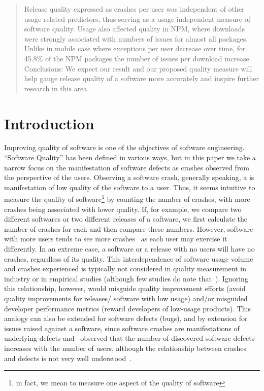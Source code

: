 \documentclass[smallextended]{svjour3}       %
\begin{document}
\begin{abstract}
  Release quality expressed as crashes per user was independent of
  other usage-related predictors, thus serving as a usage independent
  measure of software quality. Usage also affected quality in NPM, where
  downloads were strongly associated with numbers of issues for
  almost all packages. Unlike in mobile case where exceptions per
  user decrease over time, %
  for 45.8\% of the NPM packages the number of issues per download
  increase.
Conclusions: We expect our result and our proposed quality measure will help
  gauge release quality of a software more accurately and inspire further 
  research in this area.

\end{abstract}

\section{Introduction}\label{s:intro}

Improving quality of software is one of the objectives of software
engineering.  ``Software Quality'' has been defined in various ways,
but in this paper we take a narrow focus on the manifestation of software
defects as crashes observed from the perspective of the
users. Observing a software crash, generally speaking, a is
manifestation of low quality of the software to a user. 
Thus, it seems intuitive to measure the quality of software\footnote{in fact, we
  mean to measure one aspect of the quality of software}
by counting the number of crashes, with more crashes being associated
with lower quality. If, for example, we compare 
two different softwares or two different releases of a software,
we first calculate the number of crashes for each and then compare
these numbers. However, software with more users tends
to see more crashes~\cite{dey2018modeling,hmps15,IQ08} as each user
may exercise it differently. In
an extreme case, a software or a release with no users will have
no crashes, regardless of its quality. This interdependence of
software usage volume and crashes experienced is typically not
considered in quality measurement in industry or in empirical studies (although few studies
do note that~\cite{fenton2008using,fenton1999critique}).
Ignoring this relationship, however, would misguide quality
improvement efforts (avoid quality improvements for releases/
software with low usage) and/or misguided developer
performance metrics (reward developers of low-usage products). 
This analogy can also be extended for software
defects (bugs), and by extension for issues raised against a
software, since software crashes are manifestations of underlying
defects and~\cite{caper,hmps15} observed that the number of
discovered software defects increases with the number of users,
although the relationship between crashes and defects is not very
well understood~\cite{fenton1999critique}.  
\end{document}
